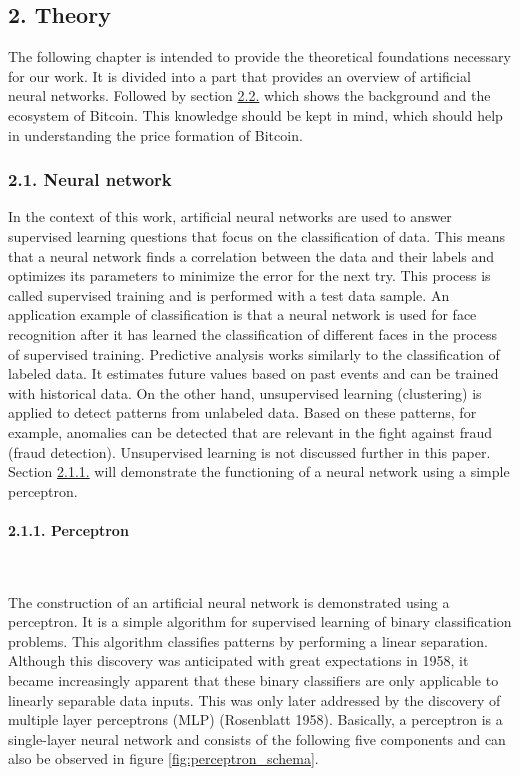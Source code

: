 \documentclass[
]{article}
\author{}
\date{\vspace{-2.5em}}
\begin{document}
\hypertarget{theory}{%
\subsection{2. Theory}\label{theory}}

The following chapter is intended to provide the theoretical foundations
necessary for our work. It is divided into a part that provides an
overview of artificial neural networks. Followed by section
\protect\hyperlink{bitcoin}{2.2.} which shows the background and the
ecosystem of Bitcoin. This knowledge should be kept in mind, which
should help in understanding the price formation of Bitcoin.

\hypertarget{neural_network}{%
\subsubsection{2.1. Neural network}\label{neural_network}}

In the context of this work, artificial neural networks are used to
answer supervised learning questions that focus on the classification of
data. This means that a neural network finds a correlation between the
data and their labels and optimizes its parameters to minimize the error
for the next try. This process is called supervised training and is
performed with a test data sample. An application example of
classification is that a neural network is used for face recognition
after it has learned the classification of different faces in the
process of supervised training. Predictive analysis works similarly to
the classification of labeled data. It estimates future values based on
past events and can be trained with historical data. On the other hand,
unsupervised learning (clustering) is applied to detect patterns from
unlabeled data. Based on these patterns, for example, anomalies can be
detected that are relevant in the fight against fraud (fraud detection).
Unsupervised learning is not discussed further in this paper. Section
\protect\hyperlink{perceptron}{2.1.1.} will demonstrate the functioning
of a neural network using a simple perceptron.

\hypertarget{perceptron}{%
\paragraph{2.1.1. Perceptron}\label{perceptron}}

~

The construction of an artificial neural network is demonstrated using a
perceptron. It is a simple algorithm for supervised learning of binary
classification problems. This algorithm classifies patterns by
performing a linear separation. Although this discovery was anticipated
with great expectations in 1958, it became increasingly apparent that
these binary classifiers are only applicable to linearly separable data
inputs. This was only later addressed by the discovery of multiple layer
perceptrons (MLP) (Rosenblatt 1958). Basically, a perceptron is a
single-layer neural network and consists of the following five
components and can also be observed in figure
\ref{fig:perceptron_schema}.
\end{document}
